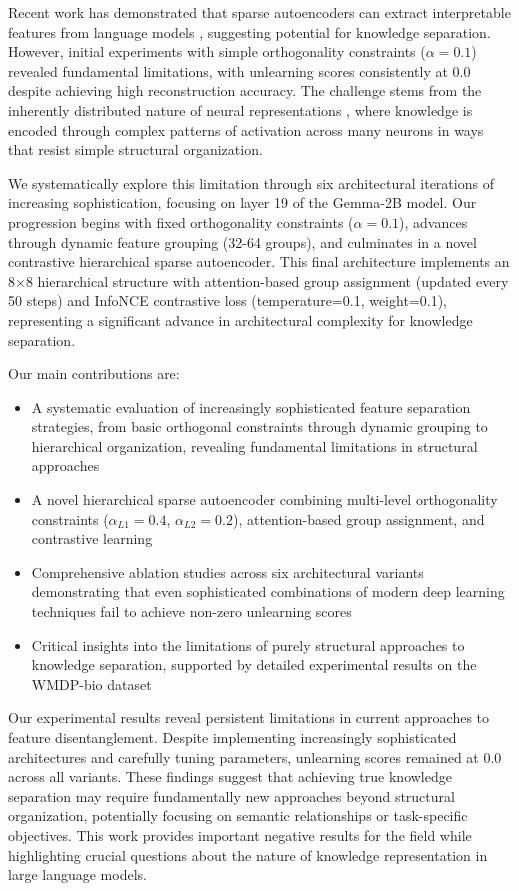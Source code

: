 \documentclass{article} %
\begin{document}
Recent work has demonstrated that sparse autoencoders can extract interpretable features from language models \cite{Paulo2024AutomaticallyIM}, suggesting potential for knowledge separation. However, initial experiments with simple orthogonality constraints ($\alpha=0.1$) revealed fundamental limitations, with unlearning scores consistently at 0.0 despite achieving high reconstruction accuracy. The challenge stems from the inherently distributed nature of neural representations \cite{Elhage2022ToyMO}, where knowledge is encoded through complex patterns of activation across many neurons in ways that resist simple structural organization.

We systematically explore this limitation through six architectural iterations of increasing sophistication, focusing on layer 19 of the Gemma-2B model. Our progression begins with fixed orthogonality constraints ($\alpha=0.1$), advances through dynamic feature grouping (32-64 groups), and culminates in a novel contrastive hierarchical sparse autoencoder. This final architecture implements an 8$\times$8 hierarchical structure with attention-based group assignment (updated every 50 steps) and InfoNCE contrastive loss (temperature=0.1, weight=0.1), representing a significant advance in architectural complexity for knowledge separation.

Our main contributions are:
\begin{itemize}
    \item A systematic evaluation of increasingly sophisticated feature separation strategies, from basic orthogonal constraints through dynamic grouping to hierarchical organization, revealing fundamental limitations in structural approaches
    \item A novel hierarchical sparse autoencoder combining multi-level orthogonality constraints ($\alpha_{L1}=0.4$, $\alpha_{L2}=0.2$), attention-based group assignment, and contrastive learning
    \item Comprehensive ablation studies across six architectural variants demonstrating that even sophisticated combinations of modern deep learning techniques fail to achieve non-zero unlearning scores
    \item Critical insights into the limitations of purely structural approaches to knowledge separation, supported by detailed experimental results on the WMDP-bio dataset
\end{itemize}

Our experimental results reveal persistent limitations in current approaches to feature disentanglement. Despite implementing increasingly sophisticated architectures and carefully tuning parameters, unlearning scores remained at 0.0 across all variants. These findings suggest that achieving true knowledge separation may require fundamentally new approaches beyond structural organization, potentially focusing on semantic relationships or task-specific objectives. This work provides important negative results for the field while highlighting crucial questions about the nature of knowledge representation in large language models.
\end{document}
